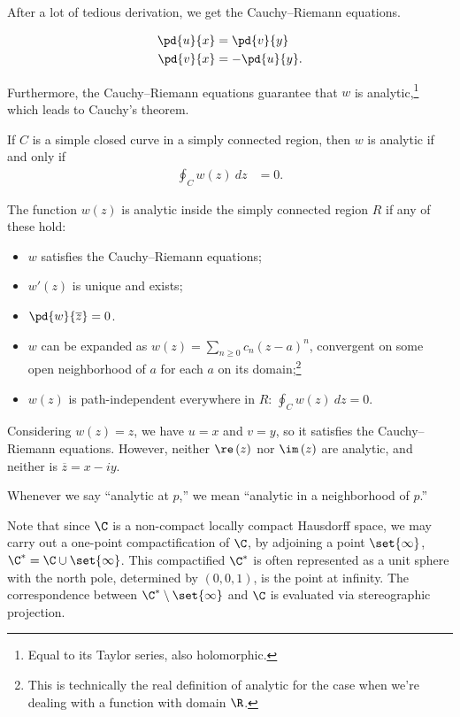 \documentclass[10pt]{mypackage}
\begin{document}
After a lot of tedious derivation, we get the Cauchy--Riemann equations.
\begin{theorem}
  \begin{align*}
    \pd{u}{x} &= \pd{v}{y}\\
    \pd{v}{x} &= -\pd{u}{y}.
  \end{align*}
\end{theorem}
Furthermore, the Cauchy--Riemann equations guarantee that $w$ is analytic,\footnote{Equal to its Taylor series, also holomorphic.} which leads to Cauchy's theorem.
\begin{theorem}
  If $C$ is a simple closed curve in a simply connected region, then $w$ is analytic if and only if
  \begin{align*}
    \oint_{C}^{} w(z)\:dz &= 0.\label{thm:cauchy_integral_thm}\tag{\textdagger}
  \end{align*}
\end{theorem}
\begin{fact}
The function $w(z)$ is analytic inside the simply connected region $R$ if any of these hold:
\begin{itemize}
  \item $w$ satisfies the Cauchy--Riemann equations;
  \item $w'(z)$ is unique and exists;
  \item $\pd{w}{\overline{z}} = 0$.
  \item $w$ can be expanded as $w(z) = \sum_{n\geq 0}c_n\left( z-a \right)^n$, convergent on some open neighborhood of $a$ for each $a$ on its domain;\footnote{This is technically the real definition of analytic for the case when we're dealing with a function with domain $\R$.}
  \item $w(z)$ is path-independent everywhere in $R$: $\oint_{C}w(z)\:dz = 0$.
\end{itemize}
\end{fact}
\begin{example}
  Considering $w(z) = z$, we have $u=x$ and $v=y$, so it satisfies the Cauchy--Riemann equations. However, neither $\re\left(z\right)$ nor $\im\left(z\right)$ are analytic, and neither is $\overline{z} = x-iy$.
\end{example}
\begin{remark}
Whenever we say ``analytic at $p$,'' we mean ``analytic in a neighborhood of $p$.''
\end{remark}
Note that since $\C$ is a non-compact locally compact Hausdorff space, we may carry out a one-point compactification of $\C$, by adjoining a point $\set{\infty}$, $\C^{\ast} = \C\cup \set{\infty}$. This compactified $\C^{\ast}$ is often represented as a unit sphere with the north pole, determined by $\left(0,0,1\right)$, is the point at infinity. The correspondence between $\C^{\ast}\setminus\set{\infty}$ and $\C$ is evaluated via stereographic projection.\newline
\end{document}
